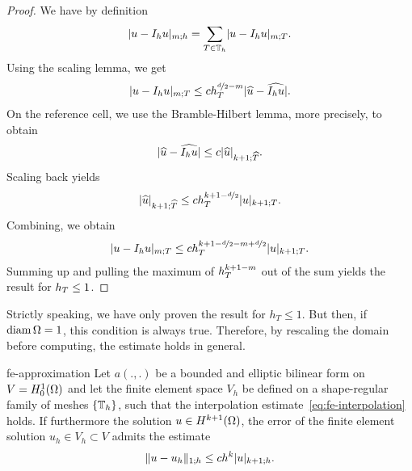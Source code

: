 \begin{proof}
  We have by definition
  \begin{gather*}
    \lvert u-I_h u\rvert_{m;h} = \sum_{T\in\mathbb T_h} \lvert u-I_h u\rvert_{m;T}.
  \end{gather*}
  Using the scaling lemma, we get
  \begin{gather*}
    \lvert u-I_h u\rvert_{m;T}
    \le c h_T^{\nicefrac d2-m} \lvert\widehat{u} - \widehat{I_hu}\rvert.
  \end{gather*}
  On the reference cell, we use the Bramble-Hilbert lemma, more
  precisely,  to obtain
  \begin{gather*}
    \lvert\widehat{u} - \widehat{I_hu}\rvert \le c \lvert\widehat{u}\rvert_{k+1;\widehat {T}}.
  \end{gather*}
  Scaling back yields
  \begin{gather*}
    \lvert\widehat{u}\rvert_{k+1;\widehat {T}}
    \le c h_T^{k+1-\nicefrac d2} \lvert u\rvert_{k+1;T}.
  \end{gather*}
  Combining, we obtain
  \begin{gather*}
    \lvert u-I_h u\rvert_{m;T} \le c h_T^{k+1-\nicefrac d2 - m +
      \nicefrac d2}\lvert u\rvert_{k+1;T}.
  \end{gather*}
  Summing up and pulling the maximum of $h_T^{k+1-m}$ out of the
  sum yields the result for $h_T \le 1$.
\end{proof}

\begin{remark}
  Strictly speaking, we have only proven the result for $h_T \le
  1$.
  But then, if $\operatorname{diam}\Omega = 1$, this condition is always
  true. Therefore, by rescaling the domain before computing, the
  estimate holds in general.
\end{remark}

\begin{Corollary}{fe-approximation}
  Let $a(.,.)$ be a bounded and elliptic bilinear form on
  $V = H^1_0(\Omega)$ and let the finite element space $V_h$ be
  defined on a shape-regular family of meshes $\{\mathbb T_h\}$, such that
  the interpolation estimate~\eqref{eq:fe-interpolation} holds. If
  furthermore the solution $u\in H^{k+1}(\Omega)$, the error of the
  finite element solution $u_h\in V_h \subset V$ admits the estimate
  \begin{gather}
    \lVert u-u_h\rVert_{1;h} \le c h^{k} \lvert u\rvert_{k+1;h}.
  \end{gather}  
\end{Corollary}

